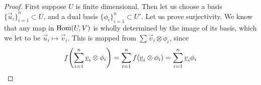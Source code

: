 \begin{proof}
    First suppose \(U\) is finite dimensional.
    Then let us choose a basis \({\{\vec{u}_i\}}_{i=1}^n \subset U\),
    and a dual basis \({\{\phi_i\}}_{i=1}^n \subset U'\).
    Let us prove surjectivity.
    We know that any map in \(\operatorname{Hom}(U,V)\)
    is wholly determined by the image of its basis,
    which we let to be \(\vec{u}_i\mapsto\vec{v}_i\).
    This is mapped from \(\sum \vec{v}_i\otimes\phi_i\), since
    \begin{equation*}
        f\pqty{\sum_{i=1}^n \vec{v}_i\otimes\phi_i}
        = \sum_{i=1}^n f(\vec{v}_i\otimes\phi_i)
        = \sum_{i=1}^n \vec{v}_i\phi_i
    \end{equation*}


\end{proof}
